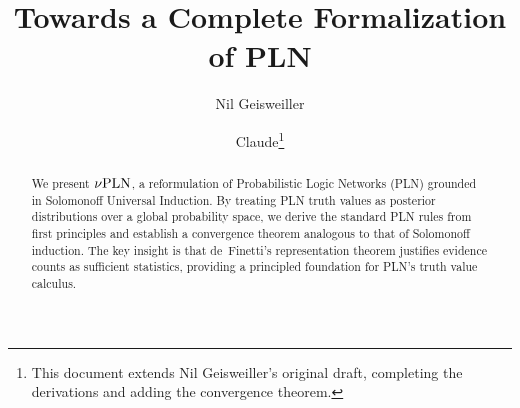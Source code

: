 \documentclass[]{article}
\begin{document}
\newcommand{\nuPLN}{\nu\textup{PLN}}
\newcommand{\Bool}{\textup{Bool}}
\newcommand{\T}{\texttt{True}}
\newcommand{\F}{\texttt{False}}
\newcommand{\Domain}{\mathcal{D}}
\newcommand{\Subsetdom}{\mathcal{S}}
\newcommand{\Predicate}{\mathcal{P}}
\newcommand{\Language}{\mathcal{L}}
\newcommand{\Bernouilli}{\mathcal{B}}
\newcommand{\Bernouillip}{\mathcal{B}_p}
\newcommand{\Field}{\mathcal{F}}
\newcommand{\Model}{M}
\newcommand{\Datax}{D_x}
\newcommand{\DataxD}{D_{x\in\Domain}}
\newcommand{\DataS}{D_{\Subsetdom}}
\newcommand{\STV}[2]{<\!#1, #2\!>}
\newcommand{\limp}{\Rightarrow}
\newcommand{\Nat}{\mathbb{N}}
\newcommand{\Real}{\mathbb{R}}
\newcommand{\anymu}{\hat{\mu}}
\newcommand{\anyomega}{\hat{\omega}}
\renewcommand{\measeq}{\doteq}

\title{Towards a Complete Formalization of PLN}
\author{Nil Geisweiller \and Claude\footnote{This document extends Nil Geisweiller's original draft, completing the derivations and adding the convergence theorem.}}
\maketitle

\begin{abstract}
We present $\nuPLN$, a reformulation of Probabilistic Logic Networks (PLN)
grounded in Solomonoff Universal Induction.  By treating PLN truth values
as posterior distributions over a global probability space, we derive the
standard PLN rules from first principles and establish a convergence theorem
analogous to that of Solomonoff induction.  The key insight is that de~Finetti's
representation theorem justifies evidence counts as sufficient statistics,
providing a principled foundation for PLN's truth value calculus.
\end{abstract}
\end{document}
